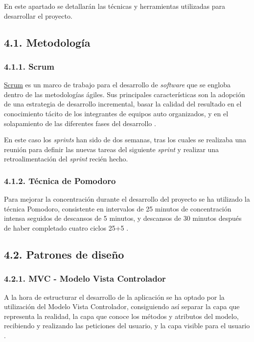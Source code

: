 
En este apartado se detallarán las técnicas y herramientas utilizadas para desarrollar el proyecto.

\subsection{4.1. Metodología}

\subsubsection{4.1.1. Scrum}

\href{https://proyectosagiles.org/que-es-scrum/}{Scrum} es un marco de trabajo para el desarrollo de \textit{software} que se engloba dentro de las metodologías ágiles. Sus principales características son la adopción de una estrategia de desarrollo incremental, basar la calidad del resultado en el conocimiento tácito de los integrantes de equipos auto organizados, y en el solapamiento de las diferentes fases del desarrollo \cite{wiki:scrum}.

En este caso los \textit{sprints} han sido de dos semanas, tras los cuales se realizaba una reunión para definir las nuevas tareas del siguiente \textit{sprint} y realizar una retroalimentación del \textit{sprint} recién hecho.

\subsubsection{4.1.2. Técnica de Pomodoro}

Para mejorar la concentración durante el desarrollo del proyecto se ha utilizado la técnica Pomodoro, consistente en intervalos de 25 minutos de concentración intensa seguidos de descansos de 5 minutos, y descansos de 30 minutos después de haber completado cuatro ciclos 25+5 \cite{wiki:pomodoro}.

\subsection{4.2. Patrones de diseño}

\subsubsection{4.2.1. MVC - Modelo Vista Controlador}

A la hora de estructurar el desarrollo de la aplicación se ha optado por la utilización del Modelo Vista Controlador, consiguiendo así separar la capa que representa la realidad, la capa que conoce los métodos y atributos del modelo, recibiendo y realizando las peticiones del usuario, y la capa visible para el usuario \cite{web:patronDis}.

